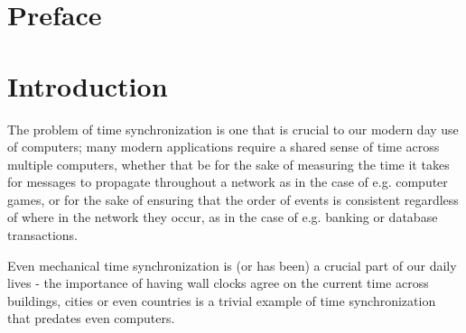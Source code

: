 \documentclass[a4paper,12pt]{article}
\date{\today}
\title{FF501 Consensus in Distributed Systems \vskip 0.3em
    \small{FF501, IMADA, University of Southern Denmark}
}
\author{
  Johan Ringmann Fagerberg - jofag17@student.sdu.dk\\
  Marcus Møller - moell17@student.sdu.dk \\
  Lucas Olai Jarlkov Olsen - luols17@student.sdu.dk\\
  Peter Heilbo Ratgen - perat17@student.sdu.dk\\
  Thomas Stenhaug - luols17@student.sdu.dk\\
  \\
  Advisor: Larisa Safina
}
\begin{document}
\maketitle

\setlength{\baselineskip}{1.44\baselineskip}

\begin{abstract}
Clock synchronization is a widely known problem that has many applications. E.g. multiple clients in a distributed system must agree on a single time in order to successfully tackle a problem. The problem has been worked on since the birth of computer networks, and solutions have evolved over time in response to changing demands. In recent years, consensus based algorithms have gained traction with the propagation of Internet of Things, and several new algorithms have been developed as a result.

We will compare two recent consensus-based algorithms for clock synchronization in distributed systems, Average TimeSynch (ATS) and Maximum Minimum Time Sync (MMTS), and implement them. The comparison will be based on the theoretical work from the algorithms' authors, our own analysis, and an implementation of both algorithms in virtual distributed networks.
\end{abstract}

\clearpage
\tableofcontents
\clearpage

\setcounter{page}{1}

\section{Preface}

\section{Introduction}

The problem of time synchronization is one that is crucial to our modern day use of computers; many modern applications require a shared sense of time across multiple computers, whether that be for the sake of measuring the time it takes for messages to propagate throughout a network as in the case of e.g. computer games, or for the sake of ensuring that the order of events is consistent regardless of where in the network they occur, as in the case of e.g. banking or database transactions.

Even mechanical time synchronization is (or has been) a crucial part of our daily lives - the importance of having wall clocks agree on the current time across buildings, cities or even countries is a trivial example of time synchronization that predates even computers.
\end{document}
